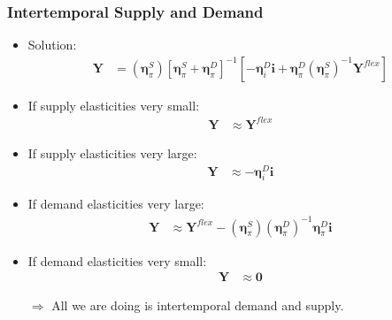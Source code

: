 \documentclass[english,xcolor=svgnames]{beamer}
\begin{document}
\begin{frame}
\begin{itemize}
\begin{itemize}
        \end{itemize}
    \end{itemize}
\end{frame}

\begin{frame}
    \frametitle{Intertemporal Supply and Demand}
    \begin{itemize}
        \item Solution:
        \begin{align*}
             \bm{Y} &= (\bm{\eta}_\pi^{S}) [\bm{\eta}_\pi^{S} +  \bm{\eta}_\pi^{D} ]^{-1}  [- \bm{\eta}_i^D \bm{i}  +  \bm{\eta}_\pi^{D} (\bm{\eta}_\pi^{S})^{-1} \bm{Y}^{flex}] 
        \end{align*}
        \item If supply elasticities very small:
        \begin{align*}
        	\bm{Y} & \approx \bm{Y}^{flex}
        \end{align*}
        \item If supply elasticities very large:
        \begin{align*}
        	\bm{Y} & \approx - \bm{\eta}_i^D \bm{i}
        \end{align*}
        \item If demand elasticities very large:
        \begin{align*}
        	\bm{Y} & \approx \bm{Y}^{flex} - (\bm{\eta}_\pi^{S})(\bm{\eta}_\pi^{D})^{-1} \bm{\eta}_\pi^{D} \bm{i}
        \end{align*}
        \item If demand elasticities very small:
        \begin{align*}
        	\bm{Y} & \approx \bm{0}
        \end{align*}
        \item[$\Rightarrow$] All we are doing is intertemporal demand and supply.
    \end{itemize}
\end{frame}
\end{document}
